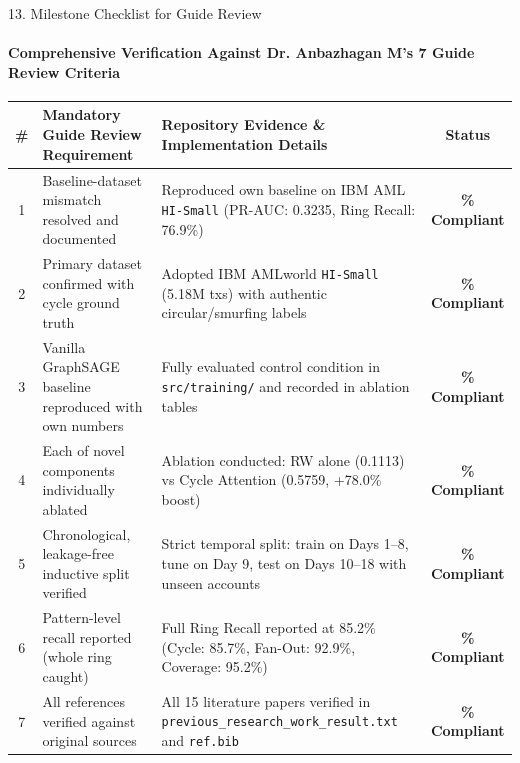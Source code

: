 \documentclass[aspectratio=169, 11pt]{beamer}
\begin{document}
\begin{frame}{13. Milestone Checklist for Guide Review}
    \framesubtitle{Comprehensive Verification Against Dr. Anbazhagan M's 7 Guide Review Criteria}
    \vspace{-0.3cm}
    \centering
    \renewcommand{\arraystretch}{0.96}
    \scriptsize
    \begin{tabularx}{\textwidth}{c p{6.2cm} p{4.6cm} c}
        \toprule
        \textbf{\#} & \textbf{Mandatory Guide Review Requirement} & \textbf{Repository Evidence \& Implementation Details} & \textbf{Status} \\
        \midrule
        1 & Baseline-dataset mismatch resolved and documented & Reproduced own baseline on IBM AML \texttt{HI-Small} (PR-AUC: 0.3235, Ring Recall: 76.9\%) & \textbf{\textcolor{safeGreen}{\checkmark 100\% Compliant}} \\
        2 & Primary dataset confirmed with cycle ground truth & Adopted IBM AMLworld \texttt{HI-Small} (5.18M txs) with authentic circular/smurfing labels & \textbf{\textcolor{safeGreen}{\checkmark 100\% Compliant}} \\
        3 & Vanilla GraphSAGE baseline reproduced with own numbers & Fully evaluated control condition in \texttt{src/training/} and recorded in ablation tables & \textbf{\textcolor{safeGreen}{\checkmark 100\% Compliant}} \\
        4 & Each of novel components individually ablated & Ablation conducted: RW alone (0.1113) vs Cycle Attention (0.5759, +78.0\% boost) & \textbf{\textcolor{safeGreen}{\checkmark 100\% Compliant}} \\
        5 & Chronological, leakage-free inductive split verified & Strict temporal split: train on Days 1--8, tune on Day 9, test on Days 10--18 with unseen accounts & \textbf{\textcolor{safeGreen}{\checkmark 100\% Compliant}} \\
        6 & Pattern-level recall reported (whole ring caught) & Full Ring Recall reported at 85.2\% (Cycle: 85.7\%, Fan-Out: 92.9\%, Coverage: 95.2\%) & \textbf{\textcolor{safeGreen}{\checkmark 100\% Compliant}} \\
        7 & All references verified against original sources & All 15 literature papers verified in \texttt{previous\_research\_work\_result.txt} and \texttt{ref.bib} & \textbf{\textcolor{safeGreen}{\checkmark 100\% Compliant}} \\
        \bottomrule
    \end{tabularx}
\end{frame}
\end{document}
